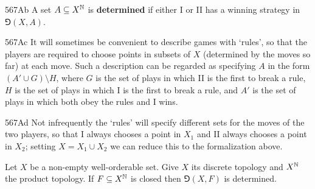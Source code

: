 \spheader 567Ab A set $A\subseteq X^{\Bbb N}$ is {\bf determined} if
either I or II has a winning strategy in $\Game(X,A)$.

\spheader 567Ac It will sometimes be convenient to describe games with
`rules', so that the players are required to choose points in subsets
of $X$ (determined by the moves so far) at each move.   Such a description
can be regarded as specifying $A$ in the form $(A'\cup G)\setminus H$,
where $G$ is the set of plays in which II is the first to break a rule, $H$
is the set of plays in which I is the first to break a rule, and $A'$ is
the set of plays in which both obey the rules and I wins.

\spheader 567Ad Not infrequently the `rules' will specify different sets
for the moves of the two players, so that I always chooses a point in
$X_1$ and II always chooses a point in $X_2$;
setting $X=X_1\cup X_2$ we can reduce this
to the formalization above.

 Let $X$ be a non-empty well-orderable set.
Give $X$ its discrete topology and $X^{\Bbb N}$ the product topology.
If $F\subseteq X^{\Bbb N}$ is closed then $\Game(X,F)$ is determined.

